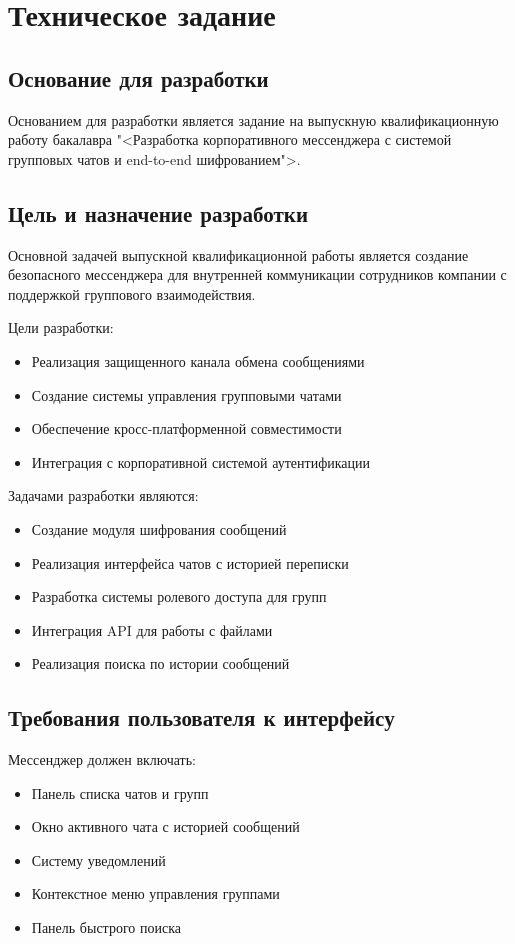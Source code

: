 \section{Техническое задание}
\subsection{Основание для разработки}

Основанием для разработки является задание на выпускную квалификационную работу бакалавра "<Разработка корпоративного мессенджера с системой групповых чатов и end-to-end шифрованием">.

\subsection{Цель и назначение разработки}

Основной задачей выпускной квалификационной работы является создание безопасного мессенджера для внутренней коммуникации сотрудников компании с поддержкой группового взаимодействия.

Цели разработки:
\begin{itemize}
	\item Реализация защищенного канала обмена сообщениями
	\item Создание системы управления групповыми чатами
	\item Обеспечение кросс-платформенной совместимости
	\item Интеграция с корпоративной системой аутентификации
\end{itemize}

Задачами разработки являются:
\begin{itemize}
	\item Создание модуля шифрования сообщений
	\item Реализация интерфейса чатов с историей переписки
	\item Разработка системы ролевого доступа для групп
	\item Интеграция API для работы с файлами
	\item Реализация поиска по истории сообщений
\end{itemize}

\subsection{Требования пользователя к интерфейсу}

Мессенджер должен включать:
\begin{itemize}
	\item Панель списка чатов и групп
	\item Окно активного чата с историей сообщений
	\item Систему уведомлений
	\item Контекстное меню управления группами
	\item Панель быстрого поиска
\end{itemize}

